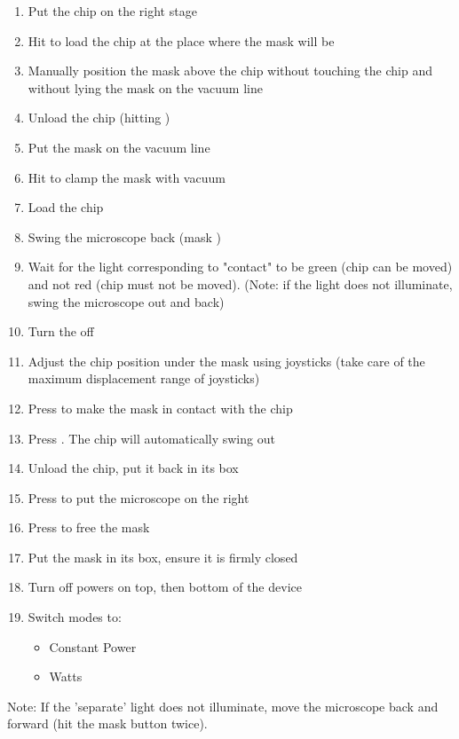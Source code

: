 \begin{enumerate}
\item Put the chip on the right stage
\item Hit  to load the chip at the place where the mask will be
\item Manually position the mask above the chip without touching the chip and without lying the mask on the vacuum line
\item Unload the chip (hitting )
\item Put the mask on the vacuum line
\item Hit  to clamp the mask with vacuum
\item Load the chip
\item Swing the microscope back (mask )
\item Wait for the light corresponding to "contact" to be green (chip can be moved) and not red (chip must not be moved).
(Note: if the light does not illuminate, swing the microscope out and back)
\item Turn the  off
\item Adjust the chip position under the mask using joysticks (take care of the maximum displacement range of joysticks)
\item Press  to make the mask in contact with the chip
\item Press . The chip will automatically swing out
\item Unload the chip, put it back in its box
\item Press  to put the microscope on the right
\item Press  to free the mask
\item Put the mask in its box, ensure it is firmly closed
\item Turn off powers on top, then bottom of the device
\item Switch modes to:
\begin{itemize}[nolistsep, noitemsep]
\item Constant Power
\item Watts
\end{itemize}
\end{enumerate}
Note: If the 'separate' light does not illuminate, move the microscope back and forward (hit the mask  button twice).
\newpage
